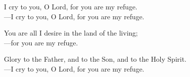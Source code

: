 \responsory

\noindent I cry to you, O Lord, for you are my refuge.\\
{\color{red}---\thinspace}I cry to you, O Lord, for you are my refuge.

\medskip\noindent You are all I desire in the land of the living;\\
{\color{red}---\thinspace}for you are my refuge.

\medskip\noindent Glory to the Father, and to the Son, and to the Holy Spirit.\\
{\color{red}---\thinspace}I cry to you, O Lord, for you are my refuge.